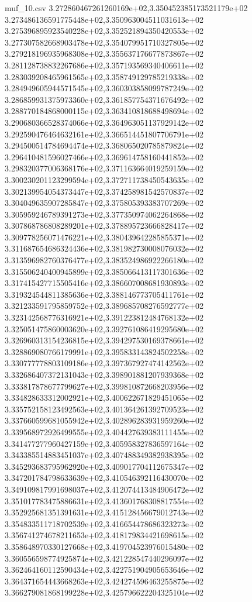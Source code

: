 \begin{filecontents*}{muf_10.csv}
3.272860467261260169e+02,3.350452385173521179e+02
3.273486136591775448e+02,3.350963004511031613e+02
3.275396895923540228e+02,3.352521894350420553e+02
3.277307582668903478e+02,3.354079951710327805e+02
3.279218196935968308e+02,3.355637176677873867e+02
3.281128738832267686e+02,3.357193569340406611e+02
3.283039208465961565e+02,3.358749129785219338e+02
3.284949605944571545e+02,3.360303858099787249e+02
3.286859931375973360e+02,3.361857754371676492e+02
3.288770184868000115e+02,3.363410818688498694e+02
3.290680366528374066e+02,3.364963051137929142e+02
3.292590476464632161e+02,3.366514451807706791e+02
3.294500514784694474e+02,3.368065020785879824e+02
3.296410481596027466e+02,3.369614758160441852e+02
3.298320377006368176e+02,3.371163664019259159e+02
3.300230201123299594e+02,3.372711738450543635e+02
3.302139954054373447e+02,3.374258981542570837e+02
3.304049635907285847e+02,3.375805393383707269e+02
3.305959246789391273e+02,3.377350974062264868e+02
3.307868786808289201e+02,3.378895723666828417e+02
3.309778256071476221e+02,3.380439642285855371e+02
3.311687654686324436e+02,3.381982730008076032e+02
3.313596982760376477e+02,3.383524986922266180e+02
3.315506240400945899e+02,3.385066413117301636e+02
3.317415427715505416e+02,3.386607008681930893e+02
3.319324544811385636e+02,3.388146773705411761e+02
3.321233591795859752e+02,3.389685708276592777e+02
3.323142568776316921e+02,3.391223812484768132e+02
3.325051475860003620e+02,3.392761086419295680e+02
3.326960313154236815e+02,3.394297530169378661e+02
3.328869080766179991e+02,3.395833143824502258e+02
3.330777778803109186e+02,3.397367927474142562e+02
3.332686407372131043e+02,3.398901881207939368e+02
3.333817878677799627e+02,3.399810872668203956e+02
3.334828633312002921e+02,3.400622671829451065e+02
3.335752158123492563e+02,3.401364261392709523e+02
3.337660599681055942e+02,3.402896283931959260e+02
3.339568972926499555e+02,3.404427639383111455e+02
3.341477277960427159e+02,3.405958327836597164e+02
3.343385514883451037e+02,3.407488349382938395e+02
3.345293683795962920e+02,3.409017704112675347e+02
3.347201784798633639e+02,3.410546392116430070e+02
3.349109817991698037e+02,3.412074413484906472e+02
3.351017783475886631e+02,3.413601768308817554e+02
3.352925681351391631e+02,3.415128456679012743e+02
3.354833511718702539e+02,3.416654478686323273e+02
3.356741274678211653e+02,3.418179834421698615e+02
3.358648970330127668e+02,3.419704523976015480e+02
3.360556598774925874e+02,3.421228547440296097e+02
3.362464160112590434e+02,3.422751904905653646e+02
3.364371654443668263e+02,3.424274596463255875e+02
3.366279081868199228e+02,3.425796622204325104e+02

\end{filecontents*}
